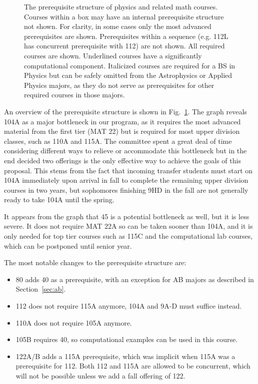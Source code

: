 \documentclass[12pt]{article}
\begin{document}
\begin{figure}
\begin{center}
\begin{tikzpicture}
\end{tikzpicture}

\caption{\label{fig:prereqs} The prerequisite structure of physics and
  related math courses.  Courses within a box may have an internal
  prerequisite structure not shown.  For clarity, in some cases only
  the most advanced prerequisites are shown.  Prerequisites within a
  sequence (e.g. 112L has concurrent prerequisite with 112) are not
  shown.  All required courses are shown.  Underlined courses have a
  significantly computational component.  Italicized courses are
  required for a BS in Physics but can be safely omitted from the
  Astrophysics or Applied Physics majors, as they do not serve as
  prerequisites for other required courses in those majors.}
\end{center}
\end{figure}

An overview of the prerequisite structure is shown in
Fig.~\ref{fig:prereqs}.  The graph reveals 104A as a major bottleneck
in our program, as it requires the most advanced material from the
first tier (MAT 22) but is required for most upper division classes,
such as 110A and 115A.  The committee spent a great deal of time
considering different ways to relieve or accommodate this bottleneck
but in the end decided two offerings is the only effective way to
achieve the goals of this proposal.  This stems from the fact that
incoming transfer students must start on 104A immediately upon arrival
in fall to complete the remaining upper division courses in two years,
but sophomores finishing 9HD in the fall are not generally ready to
take 104A until the spring.

It appears from the graph that 45 is a potential bottleneck as well,
but it is less severe.  It does not require MAT 22A so can be taken
sooner than 104A, and it is only needed for top tier courses such as
115C and the computational lab courses, which can be postponed until
senior year.

The most notable changes to the prerequisite structure are:
\begin{itemize}
\item 80 adds 40 as a prerequisite, with an exception for AB majors as described in Section~\ref{sec:ab}.
\item 112 does not require 115A anymore, 104A and 9A-D must suffice instead.
\item 110A does not require 105A anymore. 
\item 105B requires 40, so computational examples can be used in this course.
\item 122A/B adds a 115A prerequisite, which was implicit when 115A was a prerequisite for 112.  Both 112 and 115A are allowed to be concurrent, which will not be possible unless we add a fall offering of 122.
\end{itemize}
\end{document}
